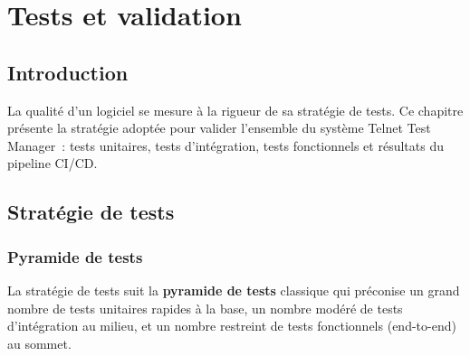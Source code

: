 \chapter{Tests et validation}

\section*{Introduction}
La qualité d'un logiciel se mesure à la rigueur de sa stratégie de tests.
Ce chapitre présente la stratégie adoptée pour valider l'ensemble du système
Telnet Test Manager~: tests unitaires, tests d'intégration, tests
fonctionnels et résultats du pipeline CI/CD.

\section{Stratégie de tests}

\subsection{Pyramide de tests}

La stratégie de tests suit la \textbf{pyramide de tests} classique qui
préconise un grand nombre de tests unitaires rapides à la base, un nombre
modéré de tests d'intégration au milieu, et un nombre restreint de tests
fonctionnels (end-to-end) au sommet.

